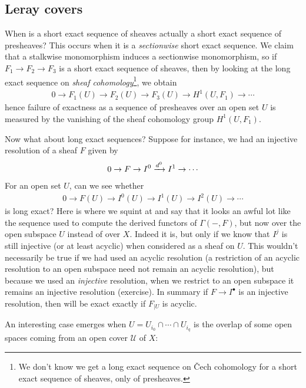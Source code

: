 \documentclass[11pt]{book}
\begin{document}
\subsection{Leray covers}
When is a short exact sequence of sheaves actually a short exact sequence of presheaves? This occurs when it is a \emph{sectionwise} short exact sequence. We claim that a stalkwise monomorphism induces a sectionwise monomorphism, so if $F_1 \to F_2 \to F_3$ is a short exact sequence of sheaves, then by looking at the long exact sequence on \emph{sheaf cohomology}\footnote{We don't know we get a long exact sequence on \v{C}ech cohomology for a short exact sequence of sheaves, only of presheaves.}, we obtain
\begin{align*}
    0 \to F_1(U) \to F_2(U) \to F_3(U) \to H^1(U,F_1) \to \cdots 
\end{align*}
hence failure of exactness as a sequence of presheaves over an open set $U$ is measured by the vanishing of the sheaf cohomology group $H^1(U,F_1)$.

Now what about long exact sequences? Suppose for instance, we had an injective resolution of a sheaf $F$ given by
\begin{align*}
    0 \to F \to I^0 \xrightarrow{d^0} I^1 \to \cdots
\end{align*}
For an open set $U$, can we see whether
\begin{equation}\label{eqn:acyclic-resolution-on-U}
\begin{aligned}
    0 \to F(U) \to I^0(U) \to I^1(U) \to I^2(U) \to \cdots
\end{aligned}
\end{equation}
is long exact? Here is where we squint at  and say that it looks an awful lot like the sequence used to compute the derived functors of $\Gamma(-,F)$, but now over the open subspace $U$ instead of over $X$. Indeed it is, but only if we know that $I^j$ is still injective (or at least acyclic) when considered as a sheaf on $U$. This wouldn't necessarily be true if we had used an acyclic resolution (a restriction of an acyclic resolution to an open subspace need not remain an acyclic resolution), but because we used an \emph{injective} resolution, when we restrict to an open subspace it remains an injective resolution (exercise). In summary if $F \to I^\bullet$ is an injective resolution, then  will be exact exactly if $F_{|U}$ is acyclic.

An interesting case emerges when $U = U_{i_0}\cap \cdots \cap U_{i_q}$ is the overlap of some open spaces coming from an open cover $\mathcal{U}$ of $X$:
\end{document}

